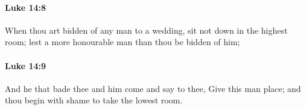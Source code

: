 		\paragraph{Luke 14:8} %
			\label{LUKE-14-8}

			When thou art bidden of any man to a wedding, sit not down in the highest room; lest a more honourable man than thou be bidden of him;

			\begin{framed}
			\scriptsize
				\begin{compactdesc}
					\item[SBLG] 
				\end{compactdesc}
			\end{framed}

		\paragraph{Luke 14:9} %
			\label{LUKE-14-9}

			And he that bade thee and him come and say to thee, Give this man place; and thou begin with shame to take the lowest room.

